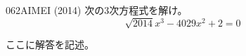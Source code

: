 \begin{thm}{062}{}{AIMEI (2014)}
 次の3次方程式を解け。\\
 \[ \sqrt{2014}x^3-4029x^2+2=0 \]
\end{thm}

ここに解答を記述。